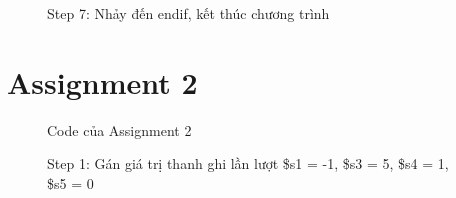 \documentclass[a4paper,12pt]{article}
\begin{document}
\begin{figure}[!h]
	\centerline{}
	\caption*{Step 7: Nhảy đến endif, kết thúc chương trình}
	\label{fig:s7}
\end{figure}
\clearpage
\newpage
\section{Assignment 2}
\begin{figure}[!h]
	\centerline{}
	\caption{Code của Assignment 2}
	\label{fig:ass2}
\end{figure}
\begin{figure}[!h]
	\centerline{}
	\caption*{Step 1: Gán giá trị thanh ghi lần lượt \$s1 = -1, \$s3 = 5, \$s4 = 1, \$s5 = 0}
	\label{fig:2s1}
\end{figure}
\end{document}
